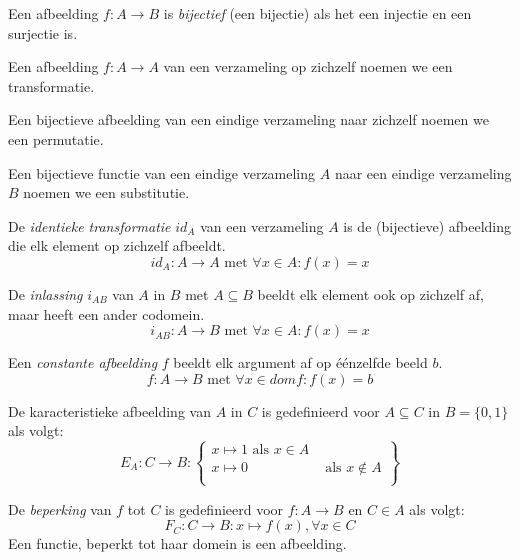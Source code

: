 \documentclass[main.tex]{subfiles}
\begin{document}
\begin{de}
  Een afbeelding $f: A \rightarrow B$ is \emph{bijectief} (een bijectie) als het een injectie en een surjectie is.
\end{de}

\begin{de}
  Een afbeelding $f: A \rightarrow A$ van een verzameling op zichzelf noemen we een transformatie.
\end{de}

\begin{de}
  Een bijectieve afbeelding van een eindige verzameling naar zichzelf noemen we een permutatie.
\end{de}

\begin{de}
  Een bijectieve functie van een eindige verzameling $A$ naar een eindige verzameling $B$ noemen we een substitutie. 
\end{de}

\begin{de}
  De \emph{identieke transformatie} $id_{A}$ van een verzameling $A$ is de (bijectieve) afbeelding die elk element op zichzelf afbeeldt.
  \[ id_{A}: A \rightarrow A \text{ met } \forall x \in A: f(x) = x \]
\end{de}

\begin{de}
  De \emph{inlassing} $i_{AB}$ van $A$ in $B$ met $A \subseteq B$ beeldt elk element ook op zichzelf af, maar heeft een ander codomein.
  \[ i_{AB}: A \rightarrow B \text{ met } \forall x \in A: f(x) = x \]
\end{de}

\begin{de}
  Een \emph{constante afbeelding} $f$ beeldt elk argument af op \'e\'enzelfde beeld $b$.
  \[ f: A \rightarrow B \text{ met } \forall x \in dom f: f(x) = b \]
\end{de}

\begin{de}
  De karacteristieke afbeelding van $A$ in $C$ is gedefinieerd voor $A \subseteq C$ in $B = \{0,1\}$ als volgt:
  \[
  E_{A}: C \rightarrow B:
  \left \lbrace
    \begin{array}{cc}
      x \mapsto 1 \text{ als } x \in A\\
      x \mapsto 0 &\text{ als } x \not\in A\\
    \end{array}
  \right \rbrace
  \]
\end{de}

\begin{de}
  De \emph{beperking} van $f$ tot $C$ is gedefinieerd  voor $f: A \rightarrow B$ en $C \in A$ als volgt:
  \[ F_{C}: C \rightarrow B: x \mapsto f(x), \forall x \in C\]
  Een functie, beperkt tot haar domein is een afbeelding.
\end{de}
\end{document}
